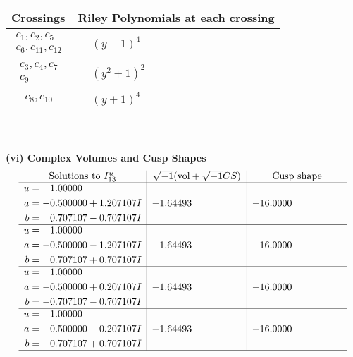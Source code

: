 \documentclass[1p]{elsarticle_modified}
\theoremstyle{definition}
\newcommand{\I}{\sqrt{-1}}
\begin{document}
\begin{tabular}{m{50pt}|m{274pt}}
Crossings & \hspace{64pt}Riley Polynomials at each crossing \\
\hline $$\begin{aligned}c_{1},c_{2},c_{5}\\c_{6},c_{11},c_{12}\end{aligned}$$&$\begin{aligned}
&(y-1)^4
\end{aligned}$\\
\hline $$\begin{aligned}c_{3},c_{4},c_{7}\\c_{9}\end{aligned}$$&$\begin{aligned}
&(y^2+1)^2
\end{aligned}$\\
\hline $$\begin{aligned}c_{8},c_{10}\end{aligned}$$&$\begin{aligned}
&(y+1)^4
\end{aligned}$\\
\hline
\end{tabular}\\~\\
\newpage\flushleft \textbf{(vi) Complex Volumes and Cusp Shapes}
$$\begin{array}{c|c|c}  
\text{Solutions to }I^u_{13}& \I (\text{vol} + \sqrt{-1}CS) & \text{Cusp shape}\\
 \hline 
\begin{aligned}
u &= \phantom{-}1.00000\phantom{ +0.000000I} \\
a &= -0.500000 + 1.207107 I \\
b &= \phantom{-}0.707107 - 0.707107 I\end{aligned}
 & -1.64493\phantom{ +0.000000I} & -16.0000\phantom{ +0.000000I} \\ \hline\begin{aligned}
u &= \phantom{-}1.00000\phantom{ +0.000000I} \\
a &= -0.500000 - 1.207107 I \\
b &= \phantom{-}0.707107 + 0.707107 I\end{aligned}
 & -1.64493\phantom{ +0.000000I} & -16.0000\phantom{ +0.000000I} \\ \hline\begin{aligned}
u &= \phantom{-}1.00000\phantom{ +0.000000I} \\
a &= -0.500000 + 0.207107 I \\
b &= -0.707107 - 0.707107 I\end{aligned}
 & -1.64493\phantom{ +0.000000I} & -16.0000\phantom{ +0.000000I} \\ \hline\begin{aligned}
u &= \phantom{-}1.00000\phantom{ +0.000000I} \\
a &= -0.500000 - 0.207107 I \\
b &= -0.707107 + 0.707107 I\end{aligned}
 & -1.64493\phantom{ +0.000000I} & -16.0000\phantom{ +0.000000I}\\
 \hline 
 \end{array}$$\newpage\newpage\renewcommand{\arraystretch}{1}
\end{document}
